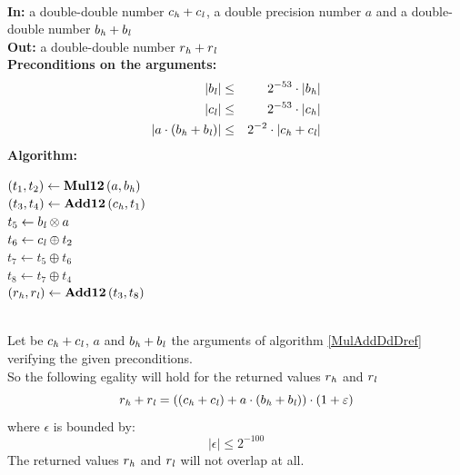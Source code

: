 \begin{algorithm}[\MulAddDdD] \label{MulAddDdDref} ~ \\
{\bf In:} a double-double number $c_{\mathit{h}} + c_{\mathit{l}}$, a double precision number $a$ and 
a double-double number $b_{\mathit{h}} + b_{\mathit{l}}$ \\
{\bf Out:} a double-double number $r_{\mathit{h}} + r_{\mathit{l}}$ \\
{\bf Preconditions on the arguments:}
\begin{eqnarray*}
\left \vert b_{\mathit{l}} \right \vert & \leq & 2^{-53} \cdot \left \vert b_{\mathit{h}} \right \vert \\
\left \vert c_{\mathit{l}} \right \vert & \leq & 2^{-53} \cdot \left \vert c_{\mathit{h}} \right \vert \\
\left \vert a \cdot \left( b_{\mathit{h}} + b_{\mathit{l}} \right) \right \vert & \leq & 2^{-2} \cdot \left \vert c_{\mathit{h}} + c_{\mathit{l}} \right \vert 
\end{eqnarray*}
{\bf Algorithm:} \\
\begin{center}
\begin{minipage}[b]{50mm}
$\left(t_1, t_2 \right) \gets \mathbf{Mul12}\left( a , b_{\mathit{h}} \right)$ \\
$\left(t_3, t_4 \right) \gets \mathbf{Add12}\left( c_{\mathit{h}} , t_1 \right)$ \\
$t_5 \gets b_{\mathit{l}} \otimes a$ \\
$t_6 \gets c_{\mathit{l}} \oplus t_2$ \\
$t_7 \gets t_5 \oplus t_6$ \\
$t_8 \gets t_7 \oplus t_4$ \\
$\left(r_{\mathit{h}}, r_{\mathit{l}} \right) \gets \mathbf{Add12}\left( t_3 , t_8 \right)$ \\
\end{minipage}
\end{center}
\end{algorithm}
\begin{theorem} ~ \\
Let be $c_{\mathit{h}} + c_{\mathit{l}}$, $a$ and $b_{\mathit{h}} + b_{\mathit{l}}$ the 
arguments of algorithm \ref{MulAddDdDref} \MulAddDdD~ verifying the given 
preconditions.\\
So the following egality will hold for the returned values $r_{\mathit{h}}$ and $r_{\mathit{l}}$ 
$$r_{\mathit{h}} + r_{\mathit{l}} = \left( \left( c_{\mathit{h}} + c_{\mathit{l}} \right) + a \cdot \left( b_{\mathit{h}} + b_{\mathit{l}} \right) \right) \cdot 
\left( 1 + \varepsilon \right)$$
where $\epsilon$ is bounded by:
$$\left \vert \epsilon \right \vert \leq 2^{-100}$$
The returned values $r_{\mathit{h}}$ and $r_{\mathit{l}}$ will not overlap at all.
\end{theorem}

